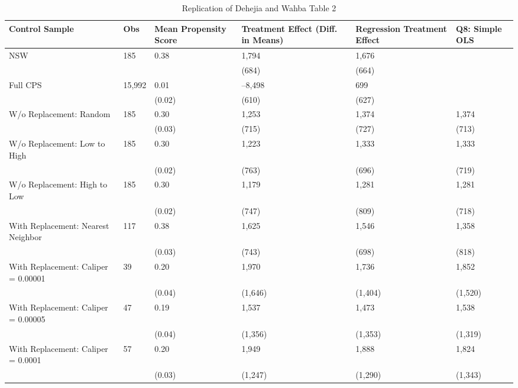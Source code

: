 \begin{table}[tbp] \centering
{}

\caption{Replication of Dehejia and Wahba Table 2}
\begin{tabularx}{\linewidth}{@{}lCCCCC@{}}

\toprule
{Control Sample}&{Obs}&{Mean Propensity Score}&{Treatment Effect (Diff. in Means)}&{Regression Treatment Effect}&{Q8: Simple OLS} \tabularnewline
\midrule \addlinespace[\belowrulesep]
NSW&185&0.38&1,794&1,676& \tabularnewline
&&&(684)&(664)& \tabularnewline
Full CPS&15,992&0.01&--8,498&699& \tabularnewline
&&(0.02)&(610)&(627)& \tabularnewline
W/o Replacement: Random&185&0.30&1,253&1,374&1,374 \tabularnewline
&&(0.03)&(715)&(727)&(713) \tabularnewline
W/o Replacement: Low to High&185&0.30&1,223&1,333&1,333 \tabularnewline
&&(0.02)&(763)&(696)&(719) \tabularnewline
W/o Replacement: High to Low&185&0.30&1,179&1,281&1,281 \tabularnewline
&&(0.02)&(747)&(809)&(718) \tabularnewline
With Replacement: Nearest Neighbor&117&0.38&1,625&1,546&1,358 \tabularnewline
&&(0.03)&(743)&(698)&(818) \tabularnewline
With Replacement: Caliper = 0.00001&39&0.20&1,970&1,736&1,852 \tabularnewline
&&(0.04)&(1,646)&(1,404)&(1,520) \tabularnewline
With Replacement: Caliper = 0.00005&47&0.19&1,537&1,473&1,538 \tabularnewline
&&(0.04)&(1,356)&(1,353)&(1,319) \tabularnewline
With Replacement: Caliper = 0.0001&57&0.20&1,949&1,888&1,824 \tabularnewline
&&(0.03)&(1,247)&(1,290)&(1,343) \tabularnewline
\bottomrule 

\end{tabularx}
\end{table}
